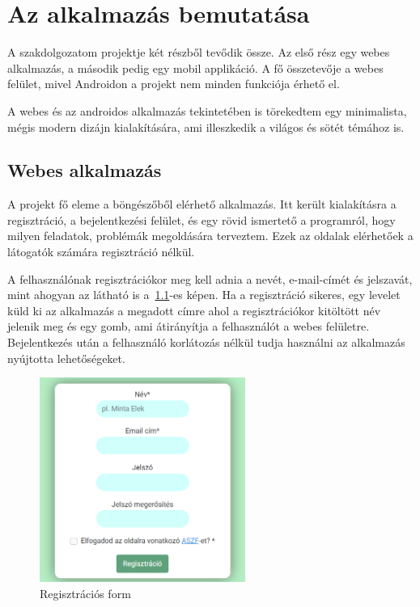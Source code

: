 \documentclass[
]{thesis-ekf}
\theoremstyle{definition}
\theoremstyle{remark}
\begin{document}
	\chapter{Az alkalmazás bemutatása}
	A szakdolgozatom projektje két részből tevődik össze. Az első rész egy webes alkalmazás, a második pedig egy mobil applikáció. A fő összetevője a webes felület, mivel Androidon a projekt nem minden funkciója érhető el. 
	
	A webes és az androidos alkalmazás tekintetében is törekedtem egy minimalista, mégis modern dizájn kialakítására, ami illeszkedik a világos és sötét témához is.
	
	\section{Webes alkalmazás}
	A projekt fő eleme a böngészőből elérhető alkalmazás. Itt került kialakításra a regisztráció, a bejelentkezési felület, és egy rövid ismertető a programról, hogy milyen feladatok, problémák megoldására terveztem. Ezek az oldalak elérhetőek a látogatók számára regisztráció nélkül.	
		
	A felhasználónak regisztrációkor meg kell adnia a nevét, e-mail-címét és jelszavát, mint ahogyan az látható is a~\ref{figure:webapp_register}-es képen. Ha a regisztráció sikeres, egy levelet küld ki az alkalmazás a megadott címre ahol a regisztrációkor kitöltött név jelenik meg és egy gomb, ami átirányítja a felhasználót a webes felületre. Bejelentkezés után a felhasználó korlátozás nélkül tudja használni az alkalmazás nyújtotta lehetőségeket. 
	
	\begin{figure}[ht!]
		\centering
		\includegraphics[width=0.6\textwidth]{web_app/web_register}
		\caption{Regisztrációs form}
		\label{figure:webapp_register}
	\end{figure}
	
\end{document}
